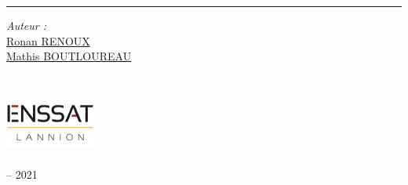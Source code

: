 \begin{titlepage}
  \doublespacing
  \large
  \hfill
  \vspace{1cm}
  \begin{center}
    \doublespacing
    \textcolor{Maroon}{\huge{\myTitle}}
  \end{center}
  \vspace{1.25cm}
  \hrule
  \vspace{1.5cm}
  \onehalfspacing
  \begin{center}

    \begin{minipage}[t]{0.5\textwidth}
      \begin{flushleft}
        \emph{Auteur :} \\
        \href{https://ronanren.github.io/}{Ronan \textsc{RENOUX}} \\
        \href{https://mboultoureau.com}{Mathis \textsc{BOUTLOUREAU}} \\
      \end{flushleft}
    \end{minipage}
    \begin{minipage}[t]{0.4\textwidth}
      \begin{flushright}
        
      \end{flushright}
    \end{minipage}\\[1.5cm]

    \hfill
    \vfill

    \includegraphics[width=3cm]{figures/ENSSAT_Logo}\\
    \href{https://www.enssat.fr/}{\mySchool}\\
    {\myDepartment} -- 2021\\
    \href{https://www.univ-rennes1.fr/}{\myUni}
  \end{center}
\end{titlepage}

